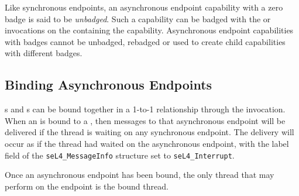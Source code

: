Like synchronous endpoints, an asynchronous endpoint capability with
a zero badge is said to be \emph{unbadged}. Such a capability can be
badged with the  or  invocations on the
 containing the capability. Asynchronous endpoint
capabilities with badges cannot be unbadged, rebadged or used to create
child capabilities with different badges.

\subsection{Binding Asynchronous Endpoints}
\label{sec:asyncep-binding}

s and s can be bound together in a 1-to-1 relationship
through the  invocation. When an
 is bound to a , then messages to that asynchronous
endpoint will be delivered if the thread is waiting on any synchronous
endpoint. The delivery will occur as if the thread had waited on the
asynchronous endpoint, with the label field of the \texttt{seL4\_MessageInfo}
structure set to \texttt{seL4\_Interrupt}.

Once an asynchronous endpoint has been bound, the only thread that may perform
 on the endpoint is the bound thread.
